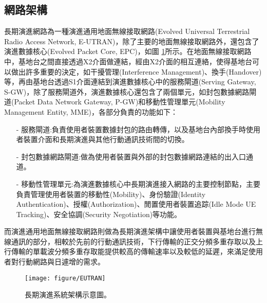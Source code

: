 \subsection{網路架構}
長期演進網路為一種演進通用地面無線接取網路(Evolved Universal Terrestrial Radio Access Network, E-UTRAN)，除了主要的地面無線接取網路外，還包含了演進數據核心(Evolved Packet Core, EPC)，如圖 \ref{fig:EUTRAN}所示。在地面無線接取網路中，基地台之間直接透過X2介面做連結，經由X2介面的相互連絡，使得基地台可以做出許多重要的決定，如干擾管理(Interference Management)、換手(Handover)等，再由基地台透過S1介面連結到演進數據核心中的服務閘道(Serving Gateway, S-GW)，除了服務閘道外，演進數據核心還包含了兩個單元，如封包數據網路閘道(Packet Data Network Gateway, P-GW)和移動性管理單元(Mobility Management Entity, MME)，各部分負責的功能如下：
\begin{itemize}
\item[-] 服務閘道:負責使用者裝置數據封包的路由轉傳，以及基地台內部換手時使用者裝置介面和長期演進與其他行動通訊技術間的切換。
\item[-] 封包數據網路閘道:做為使用者裝置與外部的封包數據網路連結的出入口通道。
\item[-] 移動性管理單元:為演進數據核心中長期演進接入網路的主要控制節點，主要負責管理使用者裝置的移動性(Mobility)、身份驗證(Identity Authentication)、授權(Authorization)、閒置使用者裝置追踪(Idle Mode UE Tracking)、安全協調(Security Negotiation)等功能。
\end{itemize}

而演進通用地面無線接取網路則做為長期演進架構中讓使用者裝置與基地台進行無線通訊的部分，相較於先前的行動通訊技術，下行傳輸的正交分頻多重存取以及上行傳輸的單載波分頻多重存取能提供較高的傳輸速率以及較低的延遲，來滿足使用者對行動網路與日遽增的需求。

\vskip 20pt
\begin{figure}[H]
\centering
\texttt{[image: figure/EUTRAN]}
\caption{\label{fig:EUTRAN}長期演進系統架構示意圖。}
\end{figure}

